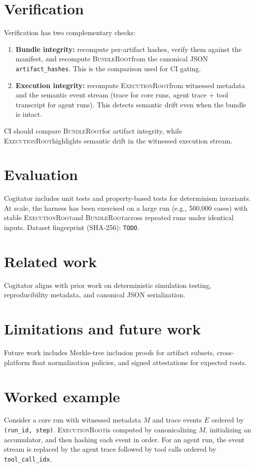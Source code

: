 \documentclass[11pt]{article}
\newcommand{\ExecutionRoot}{\textsc{ExecutionRoot}}
\newcommand{\BundleRoot}{\textsc{BundleRoot}}
\begin{document}
\section{Verification}
Verification has two complementary checks:
\begin{enumerate}[leftmargin=1.4em]
  \item \textbf{Bundle integrity:} recompute per-artifact hashes, verify them against the
  manifest, and recompute \BundleRoot from the canonical JSON \texttt{artifact\_hashes}.
  This is the comparison used for CI gating.
  \item \textbf{Execution integrity:} recompute \ExecutionRoot from witnessed metadata and
  the semantic event stream (trace for core runs, agent trace + tool transcript for
  agent runs). This detects semantic drift even when the bundle is intact.
\end{enumerate}
CI should compare \BundleRoot for artifact integrity, while \ExecutionRoot highlights
semantic drift in the witnessed execution stream.

\section{Evaluation}
Cogitator includes unit tests and property-based tests for determinism invariants.
At scale, the harness has been exercised on a large run (e.g., 500{,}000 cases) with
stable \ExecutionRoot and \BundleRoot across repeated runs under identical inputs.
Dataset fingerprint (SHA-256): \texttt{TODO}.

\section{Related work}
Cogitator aligns with prior work on deterministic simulation testing, reproducibility
metadata, and canonical JSON serialization.\cite{TODO-dst,TODO-repro,TODO-jcs}

\section{Limitations and future work}
Future work includes Merkle-tree inclusion proofs for artifact subsets, cross-platform
float normalization policies, and signed attestations for expected roots.

\appendix
\section{Worked example}
Consider a core run with witnessed metadata $M$ and trace events $E$ ordered by
\texttt{(run\_id, step)}. \ExecutionRoot is computed by canonicalizing $M$, initializing
an accumulator, and then hashing each event in order. For an agent run, the event stream
is replaced by the agent trace followed by tool calls ordered by \texttt{tool\_call\_idx}.
\end{document}
